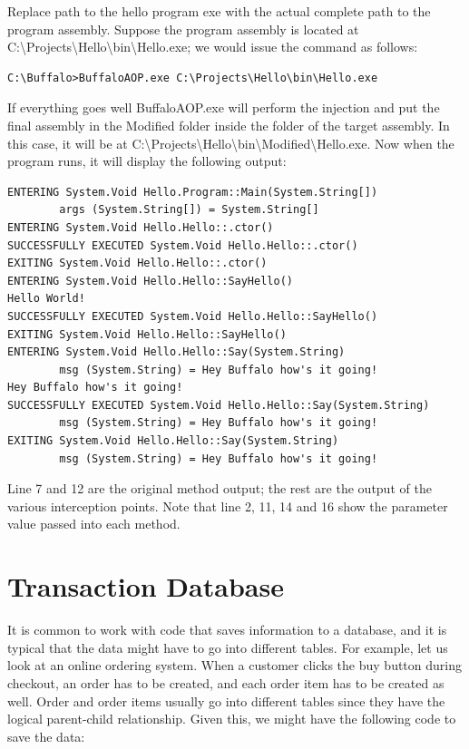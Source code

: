 Replace path to the hello program exe with the actual complete path to the program assembly. Suppose the program assembly is located at C:\textbackslash{Projects}\textbackslash{Hello}\textbackslash{bin}\textbackslash{Hello.exe}; we would issue the command as follows:

\begin{lstlisting}[caption={Invoking BuffaloAOP.exe Example}, label=buffalocmd2, frame=tb, basicstyle=\scriptsize]
C:\Buffalo>BuffaloAOP.exe C:\Projects\Hello\bin\Hello.exe
\end{lstlisting}

If everything goes well BuffaloAOP.exe will perform the injection and put the final assembly in the Modified folder inside the folder of the target assembly. In this case, it will be at C:\textbackslash{Projects}\textbackslash{Hello}\textbackslash{bin}\textbackslash{Modified}\textbackslash{Hello.exe}. Now when the program runs, it will display the following output:

\begin{lstlisting}[caption={TraceAspect Output}, label=traceaspectout, frame=tb, basicstyle=\scriptsize]
ENTERING System.Void Hello.Program::Main(System.String[])
        args (System.String[]) = System.String[]
ENTERING System.Void Hello.Hello::.ctor()
SUCCESSFULLY EXECUTED System.Void Hello.Hello::.ctor()
EXITING System.Void Hello.Hello::.ctor()
ENTERING System.Void Hello.Hello::SayHello()
Hello World!
SUCCESSFULLY EXECUTED System.Void Hello.Hello::SayHello()
EXITING System.Void Hello.Hello::SayHello()
ENTERING System.Void Hello.Hello::Say(System.String)
        msg (System.String) = Hey Buffalo how's it going!
Hey Buffalo how's it going!
SUCCESSFULLY EXECUTED System.Void Hello.Hello::Say(System.String)
        msg (System.String) = Hey Buffalo how's it going!
EXITING System.Void Hello.Hello::Say(System.String)
        msg (System.String) = Hey Buffalo how's it going!
\end{lstlisting}

Line 7 and 12 are the original method output; the rest are the output of the various interception points. Note that line 2, 11, 14 and 16 show the parameter value passed into each method.

\section{Transaction Database}

It is common to work with code that saves information to a database, and it is typical that the data might have to go into different tables. For example, let us look at an online ordering system. When a customer clicks the buy button during checkout, an order has to be created, and each order item has to be created as well. Order and order items usually go into different tables since they have the logical parent-child relationship. Given this, we might have the following code to save the data:


